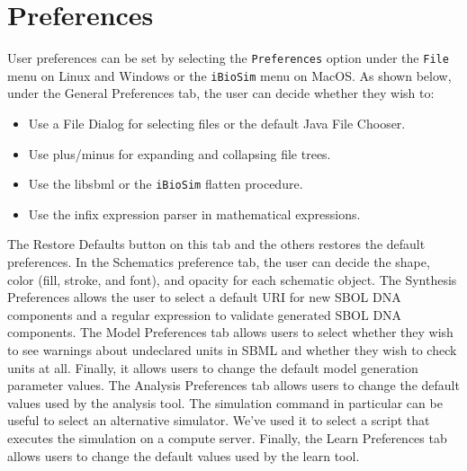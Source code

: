 \documentclass[titlepage,11pt]{article}
\begin{document}
\clearpage

\section{\label{Preferences}Preferences}

\noindent
User preferences can be set by selecting the {\tt Preferences} option under the {\tt File} menu on Linux and Windows or the {\tt iBioSim} menu on MacOS.  As shown below, under the General Preferences tab, the user can decide whether they wish to:
\begin{itemize}
\item Use a File Dialog for selecting files or the default Java File Chooser.  
\item Use plus/minus for expanding and collapsing file trees.  
\item Use the libsbml or the {\tt iBioSim} flatten procedure.
\item Use the infix expression parser in mathematical expressions.
\end{itemize}
The Restore Defaults button on this tab and the others restores the default preferences.  In the Schematics preference tab, the user can decide the shape, color (fill, stroke, and font), and opacity for each schematic object.  The Synthesis Preferences allows the user to select a default URI for new SBOL DNA components and a regular expression to validate generated SBOL DNA components.  The Model Preferences tab allows users to select whether they wish to see warnings about undeclared units in SBML and whether they wish to check units at all.  Finally, it allows users to change the default model generation parameter values.  The Analysis Preferences tab allows users to change the default values used by the analysis tool.  The simulation command in particular can be useful to select an alternative simulator.  We've used it to select a script that executes the simulation on a compute server.  Finally, the Learn Preferences tab allows users to change the default values used by the learn tool.
\end{document}
